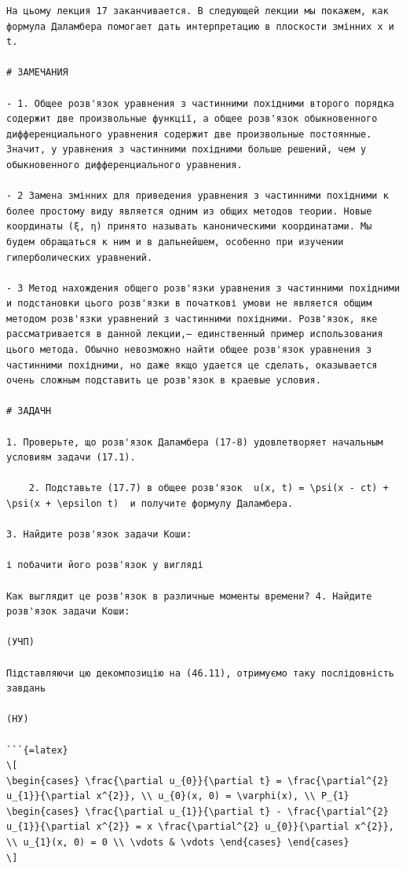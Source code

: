 \documentclass[
  ukrainian,
]{article}
\begin{document}
\begin{verbatim}
На цьому лекция 17 заканчивается. В следующей лекции мы покажем, как формула Даламбера помогает дать интерпретацию в плоскости змінних x и t.

# ЗАМЕЧАНИЯ

- 1. Общее розв'язок уравнения з частинними похідними второго порядка содержит две произвольные функції, а общее розв'язок обыкновенного дифференциального уравнения содержит две произвольные постоянные. Значит, у уравнения з частинними похідними больше решений, чем у обыкновенного дифференциального уравнения.

- 2 Замена змінних для приведения уравнения з частинними похідними к более простому виду является одним из общих методов теории. Новые координаты (ξ, η) принято называть каноническими координатами. Мы будем обращаться к ним и в дальнейшем, особенно при изучении гиперболических уравнений.

- 3 Метод нахождения общего розв'язки уравнения з частинними похідними и подстановки цього розв'язки в початкові умови не является общим методом розв'язки уравнений з частинними похідними. Розв'язок, яке рассматривается в данной лекции,— единственный пример использования цього метода. Обычно невозможно найти общее розв'язок уравнения з частинними похідними, но даже якщо удается це сделать, оказывается очень сложным подставить це розв'язок в краевые условия.

# ЗАДАЧН

1. Проверьте, що розв'язок Даламбера (17-8) удовлетворяет начальным условиям задачи (17.1).

    2. Подставьте (17.7) в общее розв'язок  u(x, t) = \psi(x - ct) + \psi(x + \epsilon t)  и получите формулу Даламбера.

3. Найдите розв'язок задачи Коши:

і побачити його розв'язок у вигляді

Как выглядит це розв'язок в различные моменты времени? 4. Найдите розв'язок задачи Коши:

(УЧП)

Підставляючи цю декомпозицію на (46.11), отримуємо таку послідовність завдань

(НУ)

```{=latex}
\[
\begin{cases} \frac{\partial u_{0}}{\partial t} = \frac{\partial^{2} u_{1}}{\partial x^{2}}, \\ u_{0}(x, 0) = \varphi(x), \\ P_{1} \begin{cases} \frac{\partial u_{1}}{\partial t} - \frac{\partial^{2} u_{1}}{\partial x^{2}} = x \frac{\partial^{2} u_{0}}{\partial x^{2}}, \\ u_{1}(x, 0) = 0 \\ \vdots & \vdots \end{cases} \end{cases}
\]
\end{verbatim}
\end{document}
